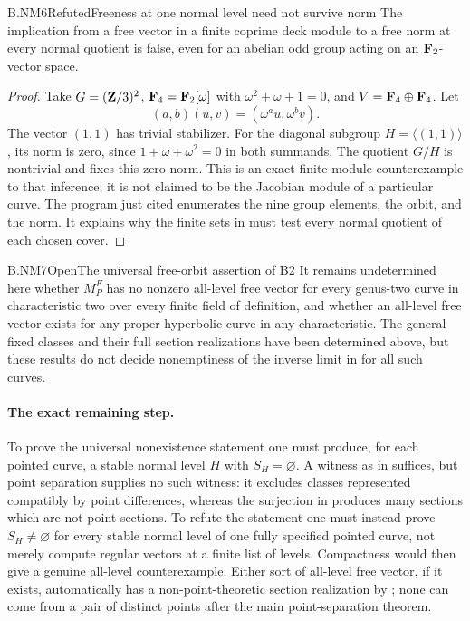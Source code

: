 \begin{claim}{B.NM6}{Refuted}{Freeness at one normal level need not survive norm}
The implication from a free vector in a finite coprime deck module
to a free norm at every normal quotient is false, even for an
abelian odd group acting on an $\mathbf F_2$-vector space.
\end{claim}
\begin{proof}
Take $G=(\mathbf Z/3)^2$, $\mathbf F_4=\mathbf F_2[\omega]$ with
$\omega^2+\omega+1=0$, and $V=\mathbf F_4\oplus\mathbf F_4$. Let
\[
          (a,b)(u,v)=(\omega^a u,\omega^b v).
\]
The vector $(1,1)$ has trivial stabilizer. For the diagonal
subgroup $H=\langle(1,1)\rangle$, its norm is zero, since
$1+\omega+\omega^2=0$ in both summands. The quotient $G/H$ is
nontrivial and fixes this zero norm. This is an exact finite-module
counterexample to that inference; it is not claimed to be the
Jacobian module of a particular curve. The program just cited
enumerates the nine group elements, the orbit, and the norm.
It explains why the finite sets in  must test
every normal quotient of each chosen cover.
\end{proof}

\begin{claim}{B.NM7}{Open}{The universal free-orbit assertion of B2}
It remains undetermined here whether $M_P^F$ has no nonzero
all-level free vector for every genus-two curve in characteristic
two over every finite field of definition, and whether an
all-level free vector exists for any proper hyperbolic curve in
any characteristic. The general fixed classes and their full
section realizations have been determined above, but these results
do not decide nonemptiness of the inverse limit in
 for all such curves.
\end{claim}
\paragraph{The exact remaining step.}
To prove the universal nonexistence statement one must produce,
for each pointed curve, a stable normal level $H$ with
$S_H=\varnothing$. A witness as in  suffices,
but point separation supplies no such witness: it excludes classes
represented compatibly by point differences, whereas the
surjection in  produces many sections which
are not point sections. To refute the statement one must instead
prove $S_H\ne\varnothing$ for every stable normal level of one
fully specified pointed curve, not merely compute regular vectors
at a finite list of levels. Compactness would then give a genuine
all-level counterexample. Either sort of all-level free vector,
if it exists, automatically has a non-point-theoretic section
realization by ; none can come from a pair of
distinct points after the main point-separation theorem.
